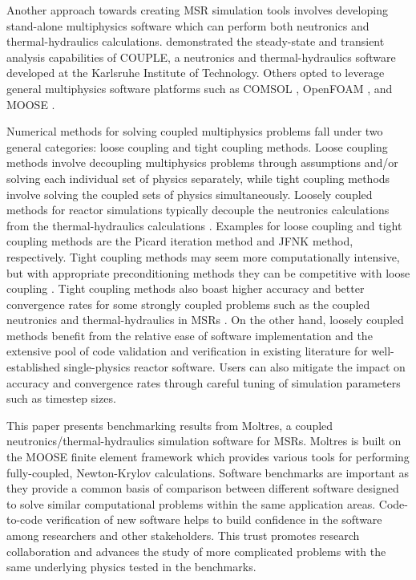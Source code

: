 Another approach towards creating \gls{MSR} simulation tools involves
developing stand-alone multiphysics software which can perform both
neutronics and thermal-hydraulics calculations. \cite{li_transient_2015}
demonstrated the steady-state and transient analysis capabilities of COUPLE, a
neutronics and thermal-hydraulics software developed at the Karlsruhe Institute
of Technology. Others opted to leverage general multiphysics software platforms
such as COMSOL \citep{comsol_ab_comsol_2018}, OpenFOAM
\citep{openfoam_openfoam_2021}, and MOOSE \citep{gaston_physics-based_2015}.


Numerical methods for solving coupled multiphysics problems fall under two
general categories: loose coupling and tight coupling methods. Loose coupling
methods involve decoupling multiphysics problems through assumptions and/or
solving each individual set of physics separately, while tight
coupling methods involve solving the coupled sets of physics simultaneously.
Loosely coupled methods for reactor simulations typically decouple the
neutronics calculations from the thermal-hydraulics calculations
\citep{wang_review_2020}. Examples for loose coupling and tight coupling methods
are the Picard iteration method and \gls{JFNK} method, respectively. Tight
coupling methods may seem more computationally
intensive, but with appropriate preconditioning methods they can be 
competitive with loose coupling \citep{wang_review_2020}.
Tight coupling methods also boast higher accuracy and better convergence rates
for some strongly coupled problems such as the coupled neutronics and
thermal-hydraulics in \glspl{MSR} \citep{lindsay_introduction_2018}. On the
other hand, loosely coupled methods benefit from the relative ease of software
implementation and the extensive pool of code validation and verification in
existing literature for well-established single-physics reactor software. Users
can also mitigate the impact on accuracy and convergence rates through
careful tuning of simulation parameters such as timestep sizes.

This paper presents benchmarking results from Moltres, a coupled
neutronics/thermal-hydraulics simulation software for \glspl{MSR}. Moltres is
built on the \gls{MOOSE} \citep{gaston_physics-based_2015} finite element
framework which provides various tools for performing fully-coupled,
Newton-Krylov calculations. Software benchmarks are important as
they provide a common basis of comparison between different software designed
to solve similar computational problems within the same application areas.
Code-to-code verification of new software helps to build confidence in the
software among researchers and other stakeholders. This trust promotes
research collaboration and advances the study of more complicated problems with
the same underlying physics tested in the benchmarks.
